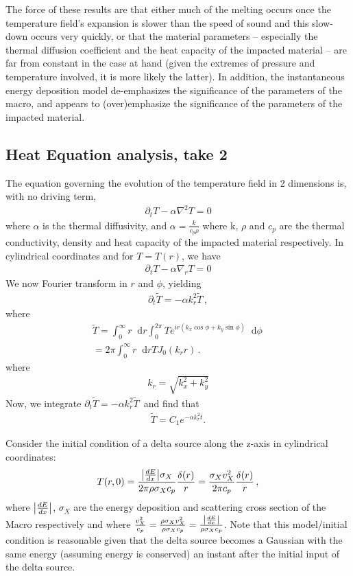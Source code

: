 \documentclass[prd,reprint,10pt]{revtex4-1}
\newcommand*\diff{\mathop{}\!\mathrm{d}}
\newcommand*\f[2]{\frac{#1}{#2}}
\begin{document}
The force of these results are that either much of the melting occurs once the temperature field's expansion is slower than the speed of sound and this slow-down occurs very quickly, or that the material parameters -- especially the thermal diffusion coefficient and the heat capacity of the impacted material -- are far from constant in the case at hand (given the extremes of pressure and temperature involved, it is more likely the latter).  In addition, the instantaneous energy deposition model de-emphasizes the significance of the parameters of the macro, and appears to (over)emphasize the significance of the parameters of the impacted material. 

\subsection{Heat Equation analysis, take 2}

The equation governing the evolution of the temperature field in 2 dimensions is, with no driving term,
\begin{align}
\partial_t T - \alpha\nabla^2 T = 0
\end{align}
where $\alpha$ is the thermal diffusivity, and $\alpha=\f{k}{c_p\rho}$ where k, $\rho$ and $c_p$ are the thermal conductivity, density and heat capacity of the impacted material respectively. In cylindrical coordinates and for $T = T(r)$, we have
\begin{align}
\partial_t T - \alpha\nabla_r T = 0
\end{align}
We now Fourier transform in $r$ and $\phi$, yielding
\begin{align}
\partial_t\tilde T =-\alpha k_r^2 \tilde T\,,
\end{align}
where
\begin{multline}
\tilde T =  \int_0^\infty r \diff r\int_{0}^{2\pi} T e^{i r(k_x\cos\phi +k_y\sin\phi)}\diff \phi\, 
\\
= 2\pi \int_0^\infty r \diff r  T J_0(k_r r)\,.
\end{multline}
where
\begin{align}
k_r = \sqrt{k_x^2 +k_y^2}
\end{align}
Now, we integrate $\partial_t\tilde T =-\alpha k_r^2 \tilde T\,$ and find that
\begin{align}
\tilde T = C_1e^{-\alpha k_r^2 t}.
\end{align}

Consider the initial condition of a delta source along the z-axis in cylindrical coordinates:
\begin{align}
T(r,0) = \f{\abs{\frac{dE}{dx}}\sigma_X}{2\pi \rho \sigma_X c_p}\f{\delta(r)}{r} = \f{\sigma_{X} v_X^2}{2\pi c_p}\f{\delta(r)}{r}\,,
\end{align}
where $\abs{\frac{dE}{dx}}$, $\sigma_{X}$ are the energy deposition and scattering cross section of the Macro respectively and where $\frac{v_{X}^2}{c_p} =  \frac{\rho \sigma_X v_X^2}{\rho \sigma_X c_p} = \frac{\abs{\frac{dE}{dx}}}{\rho \sigma_X c_p}$.  
Note that this model/initial condition is reasonable given that the delta source becomes a Gaussian with the same energy (assuming energy is conserved) an instant after the initial input of the delta source.
\end{document}
